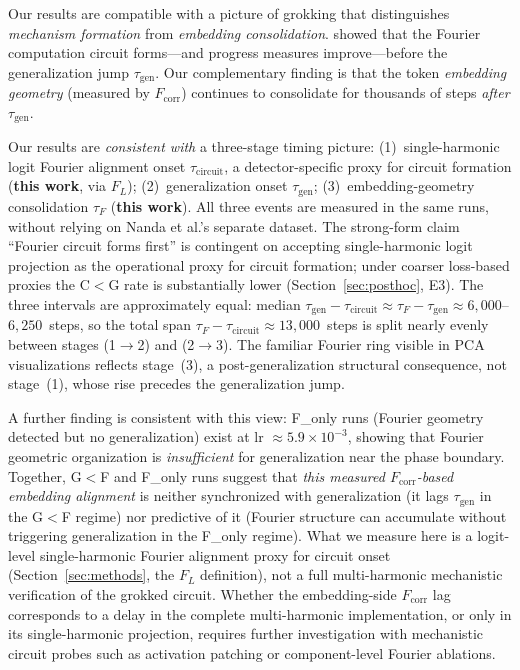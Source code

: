 \documentclass{article}
\newcommand{\taug}{\tau_{\mathrm{gen}}}
\newcommand{\tauf}{\tau_{F}}
\newcommand{\taucirc}{\tau_{\mathrm{circuit}}}
\newcommand{\fcorr}{F_{\mathrm{corr}}}
\newcommand{\flogit}{F_{L}}
\begin{document}
Our results are compatible with a picture of grokking that distinguishes
\emph{mechanism formation} from \emph{embedding consolidation}.
\citet{nanda2023progress} showed that the Fourier computation circuit
forms---and progress measures improve---before the generalization jump
$\taug$.
Our complementary finding is that the token \emph{embedding geometry}
(measured by $\fcorr$) continues to consolidate for thousands of steps
\emph{after} $\taug$.

Our results are \emph{consistent with} a three-stage timing
picture:
(1)~single-harmonic logit Fourier alignment onset $\taucirc$, a
detector-specific proxy for circuit formation
(\textbf{this work}, via $\flogit$);
(2)~generalization onset $\taug$;
(3)~embedding-geometry consolidation $\tauf$ (\textbf{this work}).
All three events are measured in the same runs, without relying on
Nanda et al.'s separate dataset.
The strong-form claim ``Fourier circuit forms first'' is contingent
on accepting single-harmonic logit projection as the operational
proxy for circuit formation; under coarser loss-based proxies the
C$<$G rate is substantially lower (Section~\ref{sec:posthoc}, E3).
The three intervals are approximately equal: median
$\taug-\taucirc\approx\tauf-\taug\approx6{,}000$--$6{,}250$~steps,
so the total span $\tauf-\taucirc\approx13{,}000$~steps is split
nearly evenly between stages (1$\to$2) and (2$\to$3).
The familiar Fourier ring visible in PCA visualizations reflects
stage~(3), a post-generalization structural consequence, not
stage~(1), whose rise precedes the generalization jump.

A further finding is consistent with this view: F\_only runs
(Fourier geometry detected but no generalization) exist at lr
$\approx5.9\times10^{-3}$, showing that Fourier geometric
organization is \emph{insufficient} for generalization near the phase
boundary.
Together, G$<$F and F\_only runs suggest that \emph{this measured
$\fcorr$-based embedding alignment} is neither synchronized with
generalization (it lags $\taug$ in the G$<$F regime) nor predictive
of it (Fourier structure can accumulate without triggering
generalization in the F\_only regime).
What we measure here is a logit-level single-harmonic Fourier
alignment proxy for circuit onset (Section~\ref{sec:methods}, the
$\flogit$ definition), not a full multi-harmonic mechanistic
verification of the grokked circuit.
Whether the embedding-side $\fcorr$ lag corresponds to a delay in
the complete multi-harmonic implementation, or only in its
single-harmonic projection, requires further investigation with
mechanistic circuit probes such as activation patching or
component-level Fourier ablations.
\end{document}
